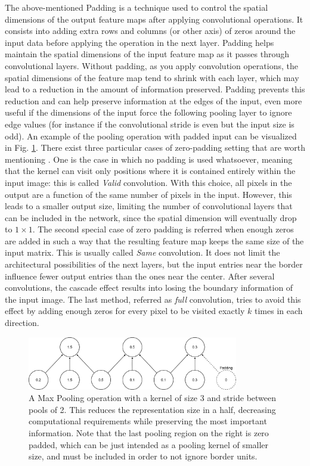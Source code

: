 \documentclass[binding=0.7cm, oneside]{sapthesis}
\begin{document}
The above-mentioned Padding is a technique used to control the spatial dimensions of the output feature maps after applying convolutional operations. It consists into adding extra rows and columns (or other axis) of zeros around the input data before applying the operation in the next layer.
Padding helps maintain the spatial dimensions of the input feature map as it passes through convolutional layers. Without padding, as you apply convolution operations, the spatial dimensions of the feature map tend to shrink with each layer, which may lead to a reduction
in the amount of information preserved. Padding prevents this reduction and can help preserve information at the edges of the input, even more useful if the dimensions of the input force the following pooling layer to ignore edge values
(for instance if the convolutional stride is even but the input size is odd). An example of the pooling operation with padded input can be visualized in Fig. \ref{fig:pooling}. There exist three particular cases of zero-padding setting that are worth mentioning \cite{padding_Conv}. One is the case in which no padding is used whatsoever, meaning that the kernel can visit
only positions where it is contained entirely within the input image: this is called \emph{Valid} convolution. With this choice, all pixels in the output are a function of the same number of pixels in the input. However, this leads to a smaller output size, limiting the number of convolutional
layers that can be included in the network, since the spatial dimension will eventually drop to $1 \times 1$. The second special case of zero padding is referred when enough zeros are added in such a way that the resulting feature map keeps the same size of the input matrix. This is usually called \emph{Same} convolution.
It does not limit the architectural possibilities of the next layers, but the input entries near the border influence fewer output entries than the ones near the center. After several convolutions, the cascade effect results into losing the boundary information of the input image.
The last method, referred as \emph{full} convolution, tries to avoid this effect by adding enough zeros for every pixel to be visited exactly $k$ times in each direction.

\begin{figure}[h]
    \centering
    \includegraphics[width=0.82\textwidth]{images/poolingMax.png}
    \caption{A Max Pooling operation with a kernel of size 3 and stride between pools of 2. This reduces the representation size in a half, decreasing computational requirements while preserving the most important information. Note that the last pooling region on the right is zero padded, which can be just intended as a pooling kernel of smaller size, and must be included in order to not ignore border units.}
    \label{fig:pooling}
\end{figure}
\end{document}
